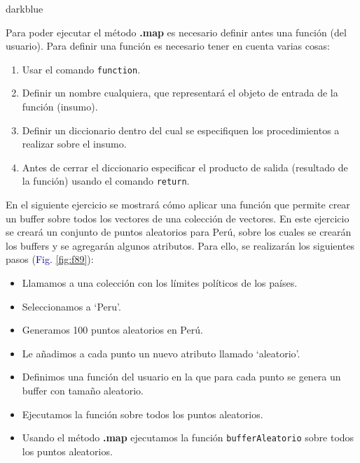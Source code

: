 \documentclass[
  12pt,
  letterpaper,
  twoside]{book}
\providecommand{\tightlist}{%
  \setlength{\itemsep}{0pt}\setlength{\parskip}{0pt}}
\newcommand\boldpurple[1]{\textcolor{darkpurple}{\textbf{#1}}}
\begin{document}
\begin{bluebox2}

\begin{awesomeblock}{5pt}{\faLightbulb}{darkblue}

Para poder ejecutar el método \boldpurple{.map} es necesario definir antes una función (del usuario). Para definir una función es necesario tener en cuenta varias cosas:

\begin{enumerate}
\def\labelenumi{\arabic{enumi}.}
\tightlist
\item
  Usar el comando \texttt{function}.
\item
  Definir un nombre cualquiera, que representará el objeto de entrada de la función (insumo).
\item
  Definir un diccionario dentro del cual se especifiquen los procedimientos a realizar sobre el insumo.
\item
  Antes de cerrar el diccionario especificar el producto de salida (resultado de la función) usando el comando \texttt{return}.
\end{enumerate}

\end{awesomeblock}

\end{bluebox2}

En el siguiente ejercicio se mostrará cómo aplicar una función que permite crear un buffer sobre todos los vectores de una colección de vectores. En este ejercicio se creará un conjunto de puntos aleatorios para Perú, sobre los cuales se crearán los buffers y se agregarán algunos atributos. Para ello, se realizarán los siguientes pasos (\textcolor{darkblue}{Fig.} \ref{fig:f89}):

\begin{itemize}
\tightlist
\item
  Llamamos a una colección con los límites políticos de los países.
\item
  Seleccionamos a `Peru'.
\item
  Generamos 100 puntos aleatorios en Perú.
\item
  Le añadimos a cada punto un nuevo atributo llamado `aleatorio'.
\item
  Definimos una función del usuario en la que para cada punto se genera un buffer con tamaño aleatorio.
\item
  Ejecutamos la función sobre todos los puntos aleatorios.
\item
  Usando el método \boldpurple{.map} ejecutamos la función \texttt{bufferAleatorio} sobre todos los puntos aleatorios.
\end{itemize}
\end{document}

